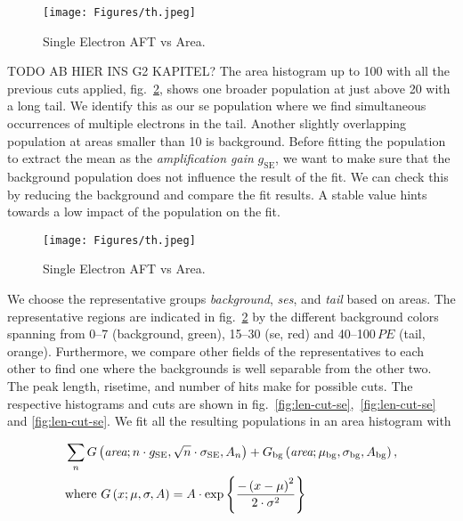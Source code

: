 \begin{figure}
    \centering
    \texttt{[image: Figures/th.jpeg]}  %
    \caption[AFT vs Area Single Electrons]{
        Single Electron AFT vs Area.
    }
    \label{fig:se-aft}
\end{figure}

TODO AB HIER INS G2 KAPITEL?
The area histogram up to \SI{100}{} with all the previous cuts applied, fig.~\ref{fig:se-area-hist}, shows one broader population at just above \SI{20}{} with a long tail.
We identify this as our \gls{se} population where we find simultaneous occurrences of multiple electrons in the tail.
Another slightly overlapping population at areas smaller than \SI{10}{} is background.
Before fitting the population to extract the mean as the \emph{amplification gain} $ g_\mathrm{SE} $, we want to make sure that the background population does not influence the result of the fit.
We can check this by reducing the background and compare the fit results.
A stable value hints towards a low impact of the population on the fit.

\begin{figure}
    \centering
    \texttt{[image: Figures/th.jpeg]}  %
    \caption[Histogram Area Single Electrons and Background]{
        Single Electron AFT vs Area.
    }
    \label{fig:se-area-hist}
\end{figure}


We choose the representative groups \emph{background}, \emph{\glspl{se}}, and \emph{tail} based on areas.
The representative regions are indicated in fig.~\ref{fig:se-area-hist} by the different background colors spanning from \numrange{0}{7} (background, green), \numrange{15}{30} (\gls{se}, red) and \numrange{40}{100}$ \,\mathit{PE} $ (tail, orange).
Furthermore, we compare other fields of the representatives to each other to find one where the backgrounds is well separable from the other two.
The peak length, risetime, and number of hits make for possible cuts.
The respective histograms and cuts are shown in fig.~\ref{fig:len-cut-se},~\ref{fig:len-cut-se} and \ref{fig:len-cut-se}.
We fit all the resulting populations in an area histogram with %


\begin{align}
    &\sum_{n} G \left(  \textit{area}; n \cdot g_\mathrm{SE}, \sqrt{n} \cdot \sigma_\mathrm{SE}, A_n \right) +
    G_\mathrm{bg} \left( \textit{area};  \mu_\mathrm{bg}, \sigma_\mathrm{bg}, A_\mathrm{bg} \right), \\
    &\mathrm{where~} G \left( x;  \mu, \sigma, A \right) = A \cdot \exp{ \left\{ \frac{-\left( x - \mu \right)^2}{2\cdot\sigma^2} \right\} }
    \label{eq:se-fit-model}
\end{align}


